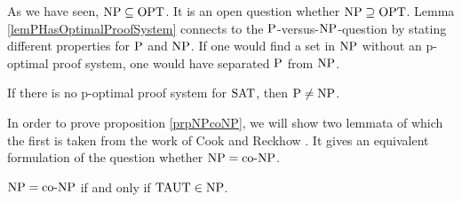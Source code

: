   As we have seen, \(\NP \subseteq \OPT\). It is an open question whether \(\NP \supseteq \OPT\). Lemma \ref{lemPHasOptimalProofSystem} connects to the \(\P\)-versus-\(\NP\)-question by stating different properties for \(\P\) and \(\NP\). If one would find a set in \(\NP\) without an p-optimal proof system, one would have separated \(\P\) from \(\NP\).

  \begin{corollary}
    If there is no p-optimal proof system for \(\SAT\), then \(\P \neq \NP\).
  \end{corollary}  
  
  In order to prove proposition \ref{prpNPcoNP}, we will show two lemmata of which the first is taken from the work of Cook and Reckhow \cite{CR79}. It gives an equivalent formulation of the question whether \(\NP = \coNP\).

  \begin{lemma} \label{lemNPisCoNP}
   \(\NP = \coNP\) if and only if \(\TAUT \in \NP\).
  \end{lemma}

  
